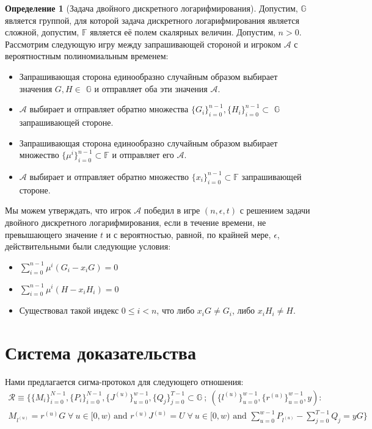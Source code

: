 \documentclass{article}
\newcommand{\F}{\mathbb{F}}
\newcommand{\A}{\mathcal{A}}
\newcommand{\sumi}{\sum_{i=0}^{n-1}}
\theoremstyle{definition}
\newtheorem{definition}{Определение}
\begin{document}
\begin{definition}[Задача двойного дискретного логарифмирования]
\label{def:dual}
Допустим, \begin{math}\mathbb{G}\end{math} является группой, для которой задача дискретного логарифмирования является сложной, допустим, $\F$ является её полем скалярных величин.
Допустим, $n > 0$.
Рассмотрим следующую игру между запрашивающей стороной и игроком $\A$ с вероятностным полиномиальным временем:
\begin{itemize}
\item Запрашивающая сторона единообразно случайным образом выбирает значения $G,H \in$ \begin{math}\mathbb{G}\end{math} и отправляет оба эти значения $\A$.
\item $\A$ выбирает и отправляет обратно множества $\{G_i\}_{i=0}^{n-1},\{H_i\}_{i=0}^{n-1} \subset$ \begin{math}\mathbb{G}\end{math} запрашивающей стороне.
\item Запрашивающая сторона единообразно случайным образом выбирает множество $\{\mu^i\}_{i=0}^{n-1} \subset \F$ и отправляет его $\A$.
\item $\A$ выбирает и отправляет обратно множество $\{x_i\}_{i=0}^{n-1} \subset \F$ запрашивающей стороне.
\end{itemize}
Мы можем утверждать, что игрок $\A$ победил в игре $(n,\epsilon,t)$ с решением задачи двойного дискретного логарифмирования, если в течение времени, не превышающего значение $t$ и с вероятностью, равной, по крайней мере, $\epsilon$, действительными были следующие условия:
\begin{itemize}
\item $\sumi \mu^i \left( G_i - x_iG \right) = 0$
\item $\sumi \mu^i \left( H - x_iH_i \right) = 0$
\item Существовал такой индекс $0 \leq i < n$, что либо $x_iG \neq G_i$, либо $x_iH_i \neq H$.
\end{itemize}
\end{definition}


\section{Система доказательства}
Нами предлагается сигма-протокол для следующего отношения:
\begin{multline*}
\mathcal{R} \equiv \Bigg\{ \{M_i\}_{i=0}^{N-1},\{P_i\}_{i=0}^{N-1},\{J^{(u)}\}_{u=0}^{w-1},\{Q_j\}_{j=0}^{T-1} \subset \mathbb{G} \: ; \: \left( \{l^{(u)}\}_{u=0}^{w-1}, \{r^{(u)}\}_{u=0}^{w-1}, y \right) : \\
M_{l^{(u)}} = r^{(u)}G \; \forall \: u \in [0,w) \text{ and } r^{(u)}J^{(u)} = U \; \forall \: u \in [0,w) \text{ and } \sum_{u=0}^{w-1} P_{l^{(u)}} - \sum_{j=0}^{T-1} Q_j = yG \Bigg\}
\end{multline*}
\end{document}
